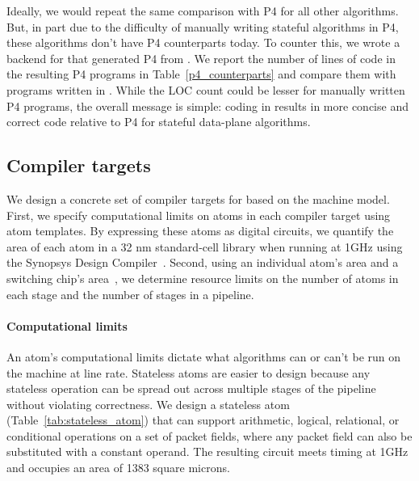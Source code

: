 Ideally, we would repeat the same comparison with P4 for all other algorithms.
But, in part due to the difficulty of manually writing stateful algorithms in
P4, these algorithms don't have P4 counterparts today. To counter this, we
wrote a backend for \pktlanguage that generated P4 from \pktlanguage.  We
report the number of lines of code in the resulting P4 programs in
Table~\ref{p4_counterparts} and compare them with programs written in
\pktlanguage. While the LOC count could be lesser for manually written P4
programs, the overall message is simple: coding in \pktlanguage results in more
concise and correct code relative to P4 for stateful data-plane algorithms.


\subsection{Compiler targets}

We design a concrete set of compiler targets for \pktlanguage based on the
\absmachine machine model. First, we specify computational limits on atoms in
each compiler target using atom templates. By expressing these atoms as digital
circuits, we quantify the area of each atom in a 32 nm standard-cell library
when running at 1GHz using the Synopsys Design Compiler~\cite{synopsys_dc}.
Second, using an individual atom's area and a switching chip's
area~\cite{gibb_parsing}, we determine resource limits on the number of atoms
in each stage and the number of stages in a pipeline.

\paragraph{Computational limits}
An atom's computational limits dictate what algorithms can or can't be run on
the \absmachine machine at line rate. Stateless atoms are easier to design
because any stateless operation can be spread out across multiple stages of the
pipeline without violating correctness. We design a stateless atom
(Table~\ref{tab:stateless_atom}) that can support arithmetic, logical,
relational, or conditional operations on a set of packet fields, where any
packet field can also be substituted with a constant operand. The resulting
circuit meets timing at 1GHz and occupies an area of 1383 square microns.

